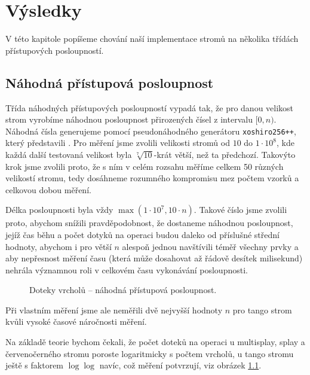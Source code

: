 \chapter{Výsledky}

V této kapitole popíšeme chování naší implementace stromů na několika třídách přístupových posloupností.

\section{Náhodná přístupová posloupnost}

Třída náhodných přístupových posloupností vypadá tak, že pro danou velikost
strom vyrobíme náhodnou posloupnost přirozených čísel z intervalu $[0,n)$.
Náhodná čísla generujeme pomocí pseudonáhodného generátoru {\tt xoshiro256++},
který představili \citet{xoshiro}. Pro měření jsme zvolili velikosti stromů od $10$ do $1\cdot
10^8$, kde každá další testovaná velikost byla $\sqrt[7]{10}$-krát větší, než ta předchozí. Takovýto krok
jsme zvolili proto, že s ním v celém rozsahu měříme celkem 50 různých velikostí
stromu, tedy dosáhneme rozumného kompromisu mez počtem vzorků a celkovou
dobou měření. 

Délka posloupnosti byla vždy $\max(1\cdot10^7, 10\cdot n)$.
Takové číslo jsme zvolili proto, abychom snížili pravděpodobnost, že dostaneme
náhodnou posloupnost, jejíž čas běhu a počet dotyků na operaci budou daleko od
příslušné střední hodnoty, abychom i pro větší $n$ alespoň jednou navštívili
téměř všechny prvky a aby
nepřesnost měření času (která může dosahovat až řádově desítek milisekund)
nehrála významnou roli v celkovém času vykonávání posloupnosti. 

\def\graphfigure#1#2{
\begin{figure}[h!]
\centering
\caption{#2}
\label{obr:#1}
\end{figure}
}

\graphfigure{touch_r}{Doteky vrcholů -- náhodná přístupová posloupnost.}


Při vlastním měření jsme ale neměřili dvě nejvyšší hodnoty $n$ pro tango strom kvůli vysoké časové náročnosti měření.

Na základě teorie bychom čekali, že počet doteků na operaci u multisplay, splay a červenočerného stromu poroste logaritmicky s počtem vrcholů, u tango stromu ještě s faktorem $\log\log$ navíc, což měření potvrzují, viz obrázek \ref{obr:touch_r}.
\let\oldlog\log
\def\log{\oldlog_2}

